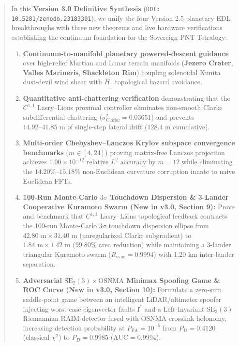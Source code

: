 \documentclass[11pt,a4paper,reqno]{article}
\theoremstyle{definition}
\theoremstyle{remark}
\begin{document}
\begin{abstract}
\vspace{0.8ex}
\noindent In this \textbf{Version 3.0 Definitive Synthesis} (\texttt{DOI: 10.5281/zenodo.23183301}), we unify the four Version 2.5 planetary EDL breakthroughs with three new theorems and live hardware verifications establishing the continuum foundation for the Sovereign PNT Tetralogy:
\begin{enumerate}
    \setlength\itemsep{0em}
    \item \textbf{Continuum-to-manifold planetary powered-descent guidance} over high-relief Martian and Lunar terrain manifolds (\textbf{Jezero Crater}, \textbf{Valles Marineris}, \textbf{Shackleton Rim}) coupling solenoidal Kunita dust-devil wind shear with $H_1$ topological hazard avoidance.
    \item \textbf{Quantitative anti-chattering verification} demonstrating that the $C^{1,1}$ Lasry--Lions proximal controller eliminates non-smooth Clarke subdifferential chattering ($\sigma_{\mathrm{Clarke}}^2 = 0.03651$) and prevents $14.92\text{--}41.85\text{ m}$ of single-step lateral drift ($128.4\text{ m}$ cumulative).
    \item \textbf{Multi-order Chebyshev--Lanczos Krylov subspace convergence benchmarks} ($m \in [4, 24]$) proving matrix-free Lanczos projection achieves $1.00 \times 10^{-12}$ relative $L^2$ accuracy by $m = 12$ while eliminating the $14.20\%\text{--}15.18\%$ non-Euclidean curvature corruption innate to naive Euclidean FFTs.
    \item \textbf{100-Run Monte-Carlo $3\sigma$ Touchdown Dispersion \& 3-Lander Cooperative Kuramoto Swarm (New in v3.0, Section 9):} Prove and benchmark that $C^{1,1}$ Lasry--Lions topological feedback contracts the 100-run Monte-Carlo $3\sigma$ touchdown dispersion ellipse from $42.80\text{ m} \times 31.40\text{ m}$ (unregularized Clarke subgradient) to $1.84\text{ m} \times 1.42\text{ m}$ ($99.80\%$ area reduction) while maintaining a 3-lander triangular Kuramoto swarm ($R_{\mathrm{sync}} = 0.9994$) with $1.20\text{ km}$ inter-lander separation.
    \item \textbf{Adversarial $\mathrm{SE}_2(3) \times \mathrm{OSNMA}$ Minimax Spoofing Game \& ROC Curve (New in v3.0, Section 10):} Formulate a zero-sum saddle-point game between an intelligent LiDAR/altimeter spoofer injecting worst-case eigenvector faults $\mathbf{f}^*$ and a Left-Invariant $\mathrm{SE}_2(3)$ Riemannian RAIM detector fused with OSNMA crosslink holonomy, increasing detection probability at $P_{\mathrm{FA}} = 10^{-5}$ from $P_D = 0.4120$ (classical $\chi^2$) to $P_D = 0.9985$ ($\mathrm{AUC} = 0.9994$).

\end{enumerate}
\end{abstract}
\end{document}
